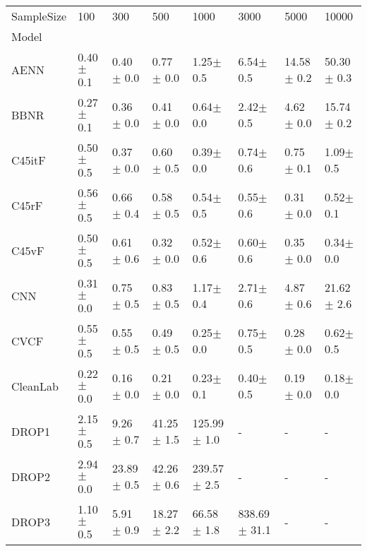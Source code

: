\begin{tabular}{llllllll}
\toprule
SampleSize &           100   &             300   &             500   &            1000  &             3000  &           5000  &            10000 \\
Model            &                 &                   &                   &                  &                   &                 &                  \\
\midrule
AENN             &   0.40$\pm$ 0.1 &     0.40$\pm$ 0.0 &     0.77$\pm$ 0.0 &    1.25$\pm$ 0.5 &     6.54$\pm$ 0.5 &  14.58$\pm$ 0.2 &   50.30$\pm$ 0.3 \\
BBNR             &   0.27$\pm$ 0.1 &     0.36$\pm$ 0.0 &     0.41$\pm$ 0.0 &    0.64$\pm$ 0.0 &     2.42$\pm$ 0.5 &   4.62$\pm$ 0.0 &   15.74$\pm$ 0.2 \\
C45itF           &   0.50$\pm$ 0.5 &     0.37$\pm$ 0.0 &     0.60$\pm$ 0.5 &    0.39$\pm$ 0.0 &     0.74$\pm$ 0.6 &   0.75$\pm$ 0.1 &    1.09$\pm$ 0.5 \\
C45rF            &   0.56$\pm$ 0.5 &     0.66$\pm$ 0.4 &     0.58$\pm$ 0.5 &    0.54$\pm$ 0.5 &     0.55$\pm$ 0.6 &   0.31$\pm$ 0.0 &    0.52$\pm$ 0.1 \\
C45vF            &   0.50$\pm$ 0.5 &     0.61$\pm$ 0.6 &     0.32$\pm$ 0.0 &    0.52$\pm$ 0.6 &     0.60$\pm$ 0.6 &   0.35$\pm$ 0.0 &    0.34$\pm$ 0.0 \\
CNN              &   0.31$\pm$ 0.0 &     0.75$\pm$ 0.5 &     0.83$\pm$ 0.5 &    1.17$\pm$ 0.4 &     2.71$\pm$ 0.6 &   4.87$\pm$ 0.6 &   21.62$\pm$ 2.6 \\
CVCF             &   0.55$\pm$ 0.5 &     0.55$\pm$ 0.5 &     0.49$\pm$ 0.5 &    0.25$\pm$ 0.0 &     0.75$\pm$ 0.5 &   0.28$\pm$ 0.0 &    0.62$\pm$ 0.5 \\
CleanLab         &   0.22$\pm$ 0.0 &     0.16$\pm$ 0.0 &     0.21$\pm$ 0.0 &    0.23$\pm$ 0.1 &     0.40$\pm$ 0.5 &   0.19$\pm$ 0.0 &    0.18$\pm$ 0.0 \\
DROP1            &   2.15$\pm$ 0.5 &     9.26$\pm$ 0.7 &    41.25$\pm$ 1.5 &  125.99$\pm$ 1.0 &                 - &               - &                - \\
DROP2            &   2.94$\pm$ 0.0 &    23.89$\pm$ 0.5 &    42.26$\pm$ 0.6 &  239.57$\pm$ 2.5 &                 - &               - &                - \\
DROP3            &   1.10$\pm$ 0.5 &     5.91$\pm$ 0.9 &    18.27$\pm$ 2.2 &   66.58$\pm$ 1.8 &  838.69$\pm$ 31.1 &               - &                - \\

\end{tabular}
